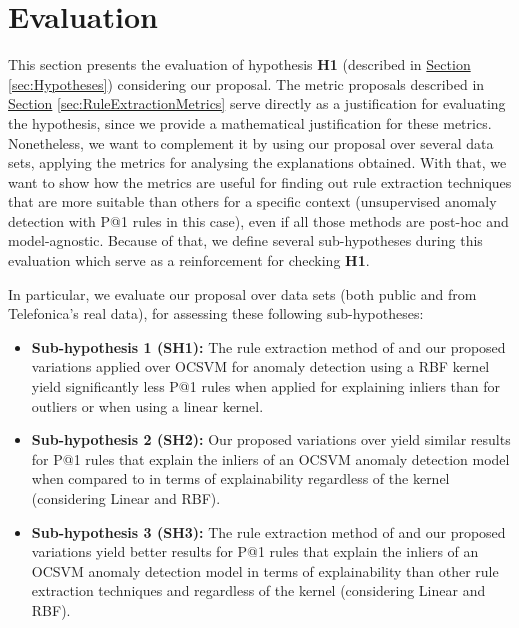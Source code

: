 \section{Evaluation}\label{sec:RuleExtractionEvaluation}
This section presents the evaluation of hypothesis \textbf{H1} (described in \hyperref[sec:Hypotheses]{Section} \ref{sec:Hypotheses}) considering our proposal. The metric proposals described in \hyperref[sec:RuleExtractionMetrics]{Section} \ref{sec:RuleExtractionMetrics} serve directly as a justification for evaluating the hypothesis, since we provide a mathematical justification for these metrics. Nonetheless, we want to complement it by using our proposal over several data sets, applying the metrics for analysing the explanations obtained. With that, we want to show how the metrics are useful for finding out rule extraction techniques that are more suitable than others for a specific context (unsupervised anomaly detection with P@1 rules in this case), even if all those methods are post-hoc and model-agnostic. Because of that, we define several sub-hypotheses during this evaluation which serve as a reinforcement for checking \textbf{H1}.

In particular, we evaluate our proposal over data sets (both public and from Telefonica's real data), for assessing these following sub-hypotheses:
\begin{itemize}
    \item \textbf{Sub-hypothesis 1 (SH1):} The rule extraction method of \parencite{nunez2002rule} and our proposed variations applied over OCSVM for anomaly detection using a RBF kernel yield significantly less P@1 rules when applied for explaining inliers than for outliers or when using a linear kernel. \label{subhypothesis:subhypothesis4_1}
    \item \textbf{Sub-hypothesis 2 (SH2):} Our proposed variations over \parencite{nunez2002rule} yield similar results for P@1 rules that explain the inliers of an OCSVM anomaly detection model when compared to \parencite{nunez2002rule} in terms of explainability regardless of the kernel (considering Linear and RBF). \label{subhypothesis:subhypothesis4_2}
    \item \textbf{Sub-hypothesis 3 (SH3):} The rule extraction method of \parencite{nunez2002rule} and our proposed variations yield better results for P@1 rules that explain the inliers of an OCSVM anomaly detection model in terms of explainability than other rule extraction techniques and regardless of the kernel (considering Linear and RBF). \label{subhypothesis:subhypothesis4_3}
\end{itemize}

